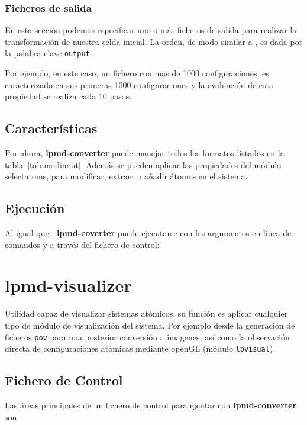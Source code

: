 \subsubsection{Ficheros de salida}
En esta secci\'on podemos especificar uno o m\'as ficheros de salida para realizar la transformaci\'on de nuestra celda inicial. La orden, de modo similar a {\lpmd}, es dada por la palabra clave \verb|output|.


Por ejemplo, en este caso, un fichero con mas de 1000 configuraciones, es caracterizado en sus primeras 1000 configuraciones y la evaluaci\'on de esta propiedad se realiza cada 10 pasos.


\subsection{Caracter\'isticas}
Por ahora, \textbf{lpmd-converter} puede manejar todos los formatos listados en la tabla~\ref{tab:modinout}. Adem\'as se pueden aplicar las propiedades del m\'odulo selectatoms, para modificar, extraer o a\~nadir \'atomos en el sistema.

\subsection{Ejecuci\'on}
Al igual que {\lpmd}, \textbf{lpmd-coverter} puede ejecutarse con los argumentos en l\'inea de comandos y a trav\'es del fichero de control:


\section{lpmd-visualizer}
Utilidad capaz de visualizar sistemas at\'omicos, su funci\'on es aplicar cualquier tipo de m\'odulo de visualizaci\'on del sistema. Por ejemplo desde la generaci\'on de ficheros \verb|pov| para una posterior conversi\'on a imagenes, as\'i como la observaci\'on directa de configuraciones at\'omicas mediante openGL (m\'odulo \verb|lpvisual|).

\subsection{Fichero de Control}

Las \'areas principales de un fichero de control para ejcutar con \textbf{lpmd-converter}, son:

